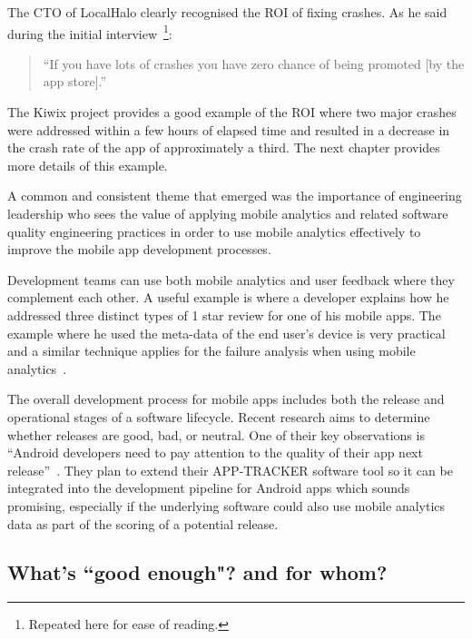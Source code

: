 The CTO of LocalHalo clearly recognised the ROI of fixing crashes. As he said during the initial interview~\footnote{Repeated here for ease of reading.}: 

\begin{quote}
    ``If you have lots of crashes you have zero chance of being promoted [by the app store].''
\end{quote}

The Kiwix project provides a good example of the ROI where two major crashes were addressed within a few hours of elapsed time and resulted in a decrease in the crash rate of the app of approximately a third. The next chapter provides more details of this example.

A common and consistent theme that emerged was the importance of engineering leadership who sees the value of applying mobile analytics and related software quality engineering practices in order to use mobile analytics effectively to improve the mobile app development processes. 

Development teams can use both mobile analytics and user feedback where they complement each other. A useful example is where a developer explains how he addressed three distinct types of 1 star review for one of his mobile apps. The example where he used the meta-data of the end user's device is very practical and a similar technique applies for the failure analysis when using mobile analytics~\citep{sunderland2019_the_one_star_android_review}.

The overall development process for mobile apps includes both the release and operational stages of a software lifecycle. Recent research aims to determine whether releases are good, bad, or neutral. One of their key observations is ``Android developers need to pay attention to the quality of their app next release''~\citep[p. 31]{saidani2022_tracking_bad_updates_in_mobile_apps_a_search_based_approach}. They plan to extend their \uppercase{App-Tracker} software tool so it can be integrated into the development pipeline for Android apps which sounds promising, especially if the underlying software could also use mobile analytics data as part of the scoring of a potential release.

\dotfill 


\subsection{What's ``good enough"? and for whom?}